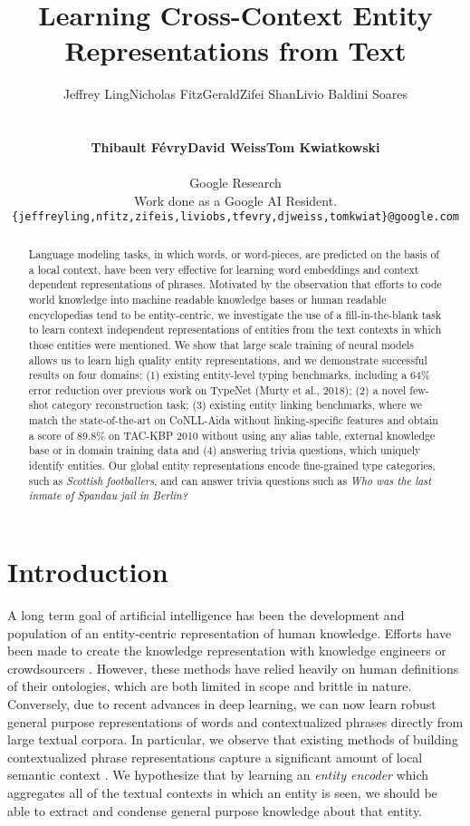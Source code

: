 \documentclass{article} \usepackage{iclr2020_conference,times}
\title{Learning Cross-Context Entity Representations from Text}
\author{\centerline{Jeffrey Ling\quad Nicholas FitzGerald\quad Zifei Shan\quad Livio Baldini Soares}\\
{\centerline{\bf Thibault F\'evry\quad David Weiss\quad Tom Kwiatkowski}} \\
Google Research\\
 Work done as a Google AI Resident.\\ 
\texttt{\{\small jeffreyling,nfitz,zifeis,liviobs,tfevry,djweiss,tomkwiat\}@google.com} \\
}
\begin{document}
\maketitle

\begin{abstract}
Language modeling tasks, in which words, or word-pieces, are predicted on the basis of a local context, have been very effective for learning word embeddings and context dependent representations of phrases.
Motivated by the observation that efforts to code world knowledge into machine readable knowledge bases or human readable encyclopedias tend to be entity-centric, we investigate the use of a fill-in-the-blank task to learn context independent representations of entities from the text contexts in which those entities were mentioned.
We show that large scale training of neural models allows us to learn high quality entity representations, and we demonstrate successful results on four domains: (1) existing entity-level typing benchmarks, including a 64\% error reduction over previous work on TypeNet (Murty et al., 2018); (2) a novel few-shot category reconstruction task; (3) existing entity linking benchmarks, where we match the state-of-the-art on CoNLL-Aida without linking-specific features and obtain a score of 89.8\% on TAC-KBP 2010 without using any alias table, external knowledge base or in domain training data and (4) answering trivia questions, which uniquely identify entities.
Our global entity representations encode fine-grained type categories, such as \emph{Scottish footballers}, and can answer trivia questions such as \emph{Who was the last inmate of Spandau jail in Berlin?}
\end{abstract}

\section{Introduction}



A long term goal of artificial intelligence has been the development and population of an entity-centric representation of human knowledge. 
Efforts have been made to create the knowledge representation with knowledge engineers \citep{lenat1986cyc} or crowdsourcers \citep{bollacker2008freebase}.
However, these methods have relied heavily on human definitions of their ontologies, which are both limited in scope and brittle in nature.
Conversely, due to recent advances in deep learning, we can now learn robust general purpose representations of words \citep{mikolov2013distributed} and contextualized phrases \citep{peters2018deep} directly from large textual corpora.
In particular, we observe that existing methods of building contextualized phrase representations capture a significant amount of local semantic context \citep{devlin2018bert}.
We hypothesize that by learning an \emph{entity encoder} which aggregates all of the textual contexts in which an entity is seen, we should be able to extract and condense general purpose knowledge about that entity.
\end{document}
